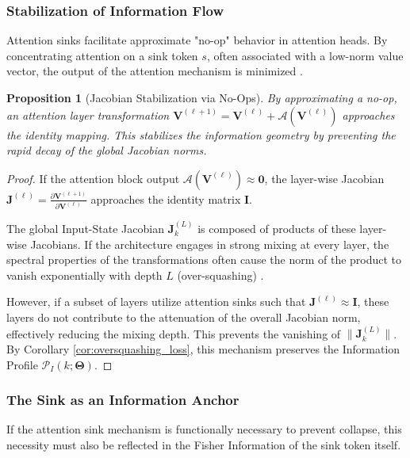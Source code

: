\documentclass{article}
\newtheorem{proposition}[theorem]{Proposition}
\theoremstyle{definition}
\begin{document}
\subsubsection{Stabilization of Information Flow}

Attention sinks facilitate approximate "no-op" behavior in attention heads. By concentrating attention on a sink token $s$, often associated with a low-norm value vector, the output of the attention mechanism is minimized \cite{barbero2025sinks}.

\begin{proposition}[Jacobian Stabilization via No-Ops]
By approximating a no-op, an attention layer transformation $\mathbf{V}^{(\ell+1)} = \mathbf{V}^{(\ell)} + \mathcal{A}(\mathbf{V}^{(\ell)})$ approaches the identity mapping. This stabilizes the information geometry by preventing the rapid decay of the global Jacobian norms.
\end{proposition}
\begin{proof}
If the attention block output $\mathcal{A}(\mathbf{V}^{(\ell)}) \approx \mathbf{0}$, the layer-wise Jacobian $\mathbf{J}^{(\ell)} = \frac{\partial \mathbf{V}^{(\ell+1)}}{\partial \mathbf{V}^{(\ell)}}$ approaches the identity matrix $\mathbf{I}$.

The global Input-State Jacobian $\mathbf{J}_k^{(L)}$ is composed of products of these layer-wise Jacobians. If the architecture engages in strong mixing at every layer, the spectral properties of the transformations often cause the norm of the product to vanish exponentially with depth $L$ (over-squashing) \cite{dong2021attention}.

However, if a subset of layers utilize attention sinks such that $\mathbf{J}^{(\ell)} \approx \mathbf{I}$, these layers do not contribute to the attenuation of the overall Jacobian norm, effectively reducing the mixing depth. This prevents the vanishing of $\|\mathbf{J}_k^{(L)}\|$. By Corollary \ref{cor:oversquashing_loss}, this mechanism preserves the Information Profile $\mathcal{P}_I(k; \mathbf{\Theta})$.
\end{proof}

\subsubsection{The Sink as an Information Anchor}

If the attention sink mechanism is functionally necessary to prevent collapse, this necessity must also be reflected in the Fisher Information of the sink token itself.
\end{document}
